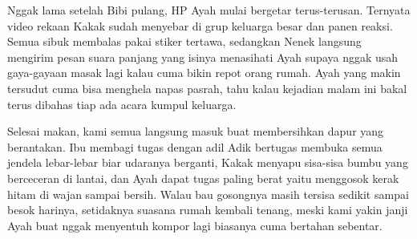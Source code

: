 Nggak lama setelah Bibi pulang, HP Ayah mulai bergetar terus-terusan. Ternyata video rekaan Kakak sudah menyebar di grup keluarga besar dan panen reaksi. Semua sibuk membalas pakai stiker tertawa, sedangkan Nenek langsung mengirim pesan suara panjang yang isinya menasihati Ayah supaya nggak usah gaya-gayaan masak lagi kalau cuma bikin repot orang rumah. Ayah yang makin tersudut cuma bisa menghela napas pasrah, tahu kalau kejadian malam ini bakal terus dibahas tiap ada acara kumpul keluarga.


Selesai makan, kami semua langsung masuk buat membersihkan dapur yang berantakan. Ibu membagi tugas dengan adil Adik bertugas membuka semua jendela lebar-lebar biar udaranya berganti, Kakak menyapu sisa-sisa bumbu yang berceceran di lantai, dan Ayah dapat tugas paling berat yaitu menggosok kerak hitam di wajan sampai bersih. Walau bau gosongnya masih tersisa sedikit sampai besok harinya, setidaknya suasana rumah kembali tenang, meski kami yakin janji Ayah buat nggak menyentuh kompor lagi biasanya cuma bertahan sebentar.

\jedahias
